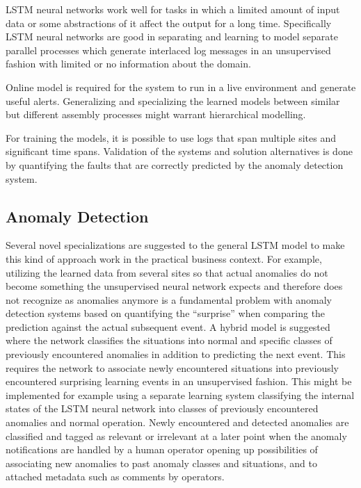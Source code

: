 \documentclass[a4paper,10pt]{article}
\begin{document}
LSTM neural networks work well for tasks in which a limited amount of input data or some abstractions of it affect the output for a long time. Specifically
LSTM neural networks are good in separating and learning to model separate parallel processes which generate interlaced log messages in an unsupervised fashion
with limited or no information about the domain.

Online model is required for the system to run in a live environment and generate useful alerts. Generalizing and specializing the learned models between similar but
different assembly processes might warrant hierarchical modelling.

For training the models, it is possible to use logs that span multiple sites and significant time spans. Validation of the systems and solution alternatives is done by quantifying
the faults that are correctly predicted by the anomaly detection system. 

\subsection{Anomaly Detection}

Several novel specializations are suggested to the general LSTM model to make this kind of approach work in the practical business context.
For example, utilizing the learned data from several sites so that actual anomalies do not become something the unsupervised neural network expects and therefore
does not recognize as anomalies anymore is a fundamental problem with anomaly detection systems based on quantifying the ``surprise'' when comparing the prediction against
the actual subsequent event. A hybrid model is suggested where the network classifies the situations into normal and specific classes
of previously encountered anomalies in addition to predicting the next event. This requires the network to associate newly encountered situations into previously
encountered surprising learning events in an unsupervised fashion. This might be implemented for example using a separate learning system classifying the internal
states of the LSTM neural network into classes of previously encountered anomalies and normal operation.
Newly encountered and detected anomalies are classified and tagged as relevant or irrelevant at a later point when the anomaly notifications are handled
by a human operator opening up possibilities of associating new anomalies to past anomaly classes and situations, and to attached metadata such as comments by operators.
\end{document}
